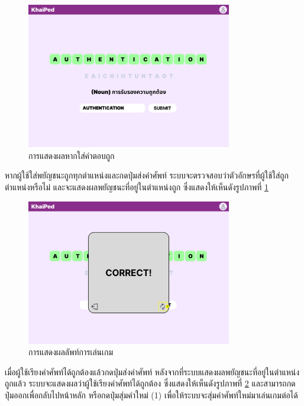 \documentclass[12pt,oneside,openright,a4paper]{cpe-thai-project}
\begin{document}
\pagebreak
\begin{figure}[!h]\centering
	\includegraphics[width=0.8\textwidth, keepaspectratio=true]{image/chap3/ui/game/Word Scramble - Correct Answer.png}
	\caption{การแสดงผลหากใส่คำตอบถูก}\label{fig:UI_GameCorrect}
\end{figure}
\hspace{1cm}
หากผู้ใช้ใส่พยัญชนะถูกทุกตำแหน่งและกดปุ่มส่งคำศัพท์ ระบบจะตรวจสอบว่าตัวอักษรที่ผู้ใช้ใส่ถูกตำแหน่งหรือไม่ และจะแสดงผลพยัญชนะที่อยู่ในตำแหน่งถูก
ซึ่งแสดงให้เห็นดังรูปภาพที่ \ref{fig:UI_GameCorrect}

\begin{figure}[!h]\centering
	\includegraphics[width=0.8\textwidth, keepaspectratio=true]{image/chap3/ui/game/Word Scramble - Pop Up.png}
	\caption{การแสดงผลลัพท์การเล่นเกม}\label{fig:UI_GameResult}
\end{figure}
\hspace{1cm}
เมื่อผู้ใช้เรียงคำศัพท์ได้ถูกต้องแล้วกดปุ่มส่งคำศัพท์ หลังจากที่ระบบแสดงผลพยัญชนะที่อยู่ในตำแหน่งถูกแล้ว ระบบจะแสดงผลว่าผู้ใช้เรียงคำศัพท์ได้ถูกต้อง
ซึ่งแสดงให้เห็นดังรูปภาพที่ \ref{fig:UI_GameResult}
และสามารถกดปุ่มออกเพื่อกลับไปหน้าหลัก หรือกดปุ่มสุ่มคำใหม่ (1) เพื่อให้ระบบจะสุ่มคำศัพท์ใหม่มาเล่นเกมต่อได้
\end{document}
